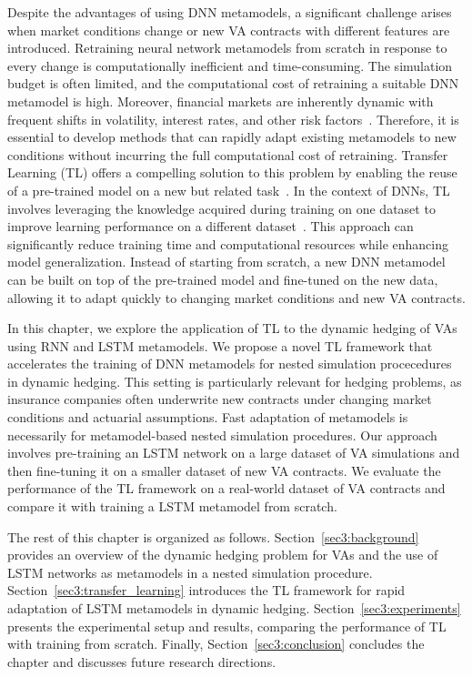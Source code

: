 Despite the advantages of using DNN metamodels, a significant challenge arises when market conditions change or new VA contracts with different features are introduced. 
Retraining neural network metamodels from scratch in response to every change is computationally inefficient and time-consuming.
The simulation budget is often limited, and the computational cost of retraining a suitable DNN metamodel is high.
Moreover, financial markets are inherently dynamic with frequent shifts in volatility, interest rates, and other risk factors~\citep{cont2001empirical}.
Therefore, it is essential to develop methods that can rapidly adapt existing metamodels to new conditions without incurring the full computational cost of retraining.
Transfer Learning (TL) offers a compelling solution to this problem by enabling the reuse of a pre-trained model on a new but related task~\citep{pan2009survey}.
In the context of DNNs, TL involves leveraging the knowledge acquired during training on one dataset to improve learning performance on a different dataset~\citep{yosinski2014transferable}.
This approach can significantly reduce training time and computational resources while enhancing model generalization.
Instead of starting from scratch, a new DNN metamodel can be built on top of the pre-trained model and fine-tuned on the new data, allowing it to adapt quickly to changing market conditions and new VA contracts.

In this chapter, we explore the application of TL to the dynamic hedging of VAs using RNN and LSTM metamodels.
We propose a novel TL framework that accelerates the training of DNN metamodels for nested simulation procecedures in dynamic hedging.
This setting is particularly relevant for hedging problems, as insurance companies often underwrite new contracts under changing market conditions and actuarial assumptions.
Fast adaptation of metamodels is necessarily for metamodel-based nested simulation procedures.
Our approach involves pre-training an LSTM network on a large dataset of VA simulations and then fine-tuning it on a smaller dataset of new VA contracts.
We evaluate the performance of the TL framework on a real-world dataset of VA contracts and compare it with training a LSTM metamodel from scratch.

The rest of this chapter is organized as follows.
Section~\ref{sec3:background} provides an overview of the dynamic hedging problem for VAs and the use of LSTM networks as metamodels in a nested simulation procedure.
Section~\ref{sec3:transfer_learning} introduces the TL framework for rapid adaptation of LSTM metamodels in dynamic hedging.
Section~\ref{sec3:experiments} presents the experimental setup and results, comparing the performance of TL with training from scratch.
Finally, Section~\ref{sec3:conclusion} concludes the chapter and discusses future research directions.


